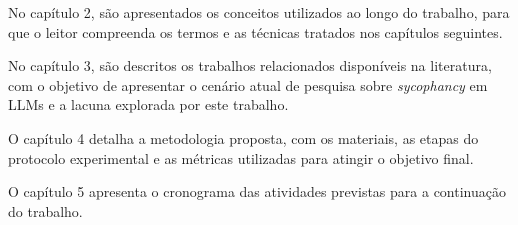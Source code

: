 No capítulo 2, são apresentados os conceitos utilizados ao longo do trabalho, para que o leitor compreenda os termos e as técnicas tratados nos capítulos seguintes.

No capítulo 3, são descritos os trabalhos relacionados disponíveis na literatura, com o objetivo de apresentar o cenário atual de pesquisa sobre \textit{sycophancy} em LLMs e a lacuna explorada por este trabalho.

O capítulo 4 detalha a metodologia proposta, com os materiais, as etapas do protocolo experimental e as métricas utilizadas para atingir o objetivo final.

O capítulo 5 apresenta o cronograma das atividades previstas para a continuação do trabalho.
